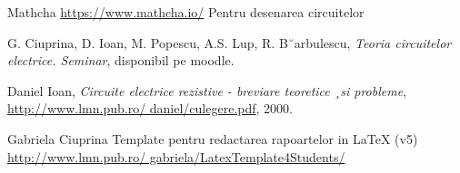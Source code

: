 \documentclass[12pt, a4paper]{article}
\begin{document}
\newpage
\begin{thebibliography}{15}
Mathcha \href{https://www.mathcha.io/}{https://www.mathcha.io/} Pentru desenarea circuitelor

G. Ciuprina, D. Ioan, M. Popescu, A.S. Lup, R. B˘arbulescu, \emph{Teoria circuitelor electrice.
Seminar}, disponibil pe moodle.

Daniel Ioan, \emph{Circuite electrice rezistive - breviare teoretice ¸si probleme},
\href{http://www.lmn.pub.ro/ daniel/culegere.pdf}{http://www.lmn.pub.ro/ daniel/culegere.pdf}, 2000.

Gabriela Ciuprina Template pentru redactarea rapoartelor in LaTeX (v5) \href{http://www.lmn.pub.ro/ gabriela/LatexTemplate4Students/}{http://www.lmn.pub.ro/ gabriela/LatexTemplate4Students/}
\end{thebibliography}
\end{document}
